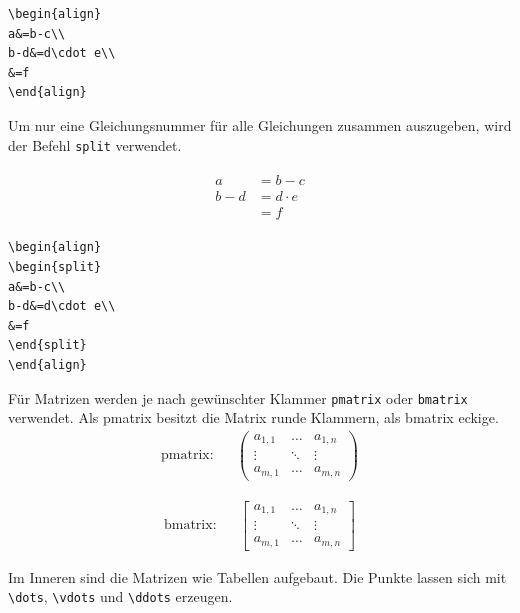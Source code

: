 \begin{verbatim}
\begin{align}
a&=b-c\\
b-d&=d\cdot e\\
&=f
\end{align}
\end{verbatim}

Um nur eine Gleichungsnummer für alle Gleichungen zusammen auszugeben, wird der Befehl \verb+split+ verwendet.

\begin{align}
\begin{split}
a&=b-c\\
b-d&=d\cdot e\\
&=f
\end{split}
\end{align}

\begin{verbatim}
\begin{align}
\begin{split}
a&=b-c\\
b-d&=d\cdot e\\
&=f
\end{split}
\end{align}
\end{verbatim}


Für Matrizen werden je nach gewünschter Klammer \verb+pmatrix+ oder \verb+bmatrix+ verwendet. Als pmatrix besitzt die Matrix runde Klammern, als bmatrix eckige. 
\begin{align}\text{pmatrix:} &&
\begin{pmatrix}
a_{1,1} & \dots & a_{1,n}\\
\vdots & \ddots & \vdots \\
a_{m,1} & \dots & a_{m,n}
\end{pmatrix} \nonumber
\end{align}


\begin{align}\text{bmatrix:} &&
\begin{bmatrix}
a_{1,1} & \dots & a_{1,n}\\
\vdots & \ddots & \vdots \\
a_{m,1} & \dots & a_{m,n}
\end{bmatrix} \nonumber
\end{align}


Im Inneren sind die Matrizen wie Tabellen aufgebaut. Die Punkte lassen sich mit \verb+\dots+, \verb+\vdots+ und \verb+\ddots+ erzeugen.  

